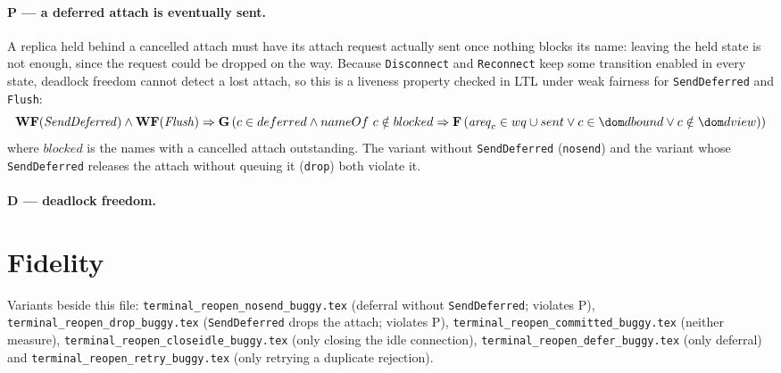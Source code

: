 \documentclass[a4paper,10pt,fleqn]{article}
\begin{document}
\paragraph{P --- a deferred attach is eventually sent.}  A replica held
behind a cancelled attach must have its attach request actually sent once
nothing blocks its name: leaving the held state is not enough, since the
request could be dropped on the way.  Because \texttt{Disconnect} and
\texttt{Reconnect} keep some transition enabled in every state, deadlock
freedom cannot detect a lost attach, so this is a liveness property checked
in LTL under weak fairness for \texttt{SendDeferred} and \texttt{Flush}:
\[
  \mathbf{WF}(\mathit{SendDeferred}) \land \mathbf{WF}(\mathit{Flush})
  \Rightarrow
  \mathbf{G}\,(c \in deferred \land nameOf~c \notin blocked
    \Rightarrow \mathbf{F}\,(\mathit{areq}_c \in wq \cup sent
      \lor c \in \dom dbound \lor c \notin \dom dview))
\]
where $blocked$ is the names with a cancelled attach outstanding.  The
variant without \texttt{SendDeferred} (\texttt{nosend}) and the variant whose
\texttt{SendDeferred} releases the attach without queuing it
(\texttt{drop}) both violate it.

\paragraph{D --- deadlock freedom.}

\section{Fidelity}

Variants beside this file: \texttt{terminal\_reopen\_nosend\_buggy.tex} (deferral without \texttt{SendDeferred}; violates P), \texttt{terminal\_reopen\_drop\_buggy.tex} (\texttt{SendDeferred} drops the attach; violates P), \texttt{terminal\_reopen\_committed\_buggy.tex} (neither measure), \texttt{terminal\_reopen\_closeidle\_buggy.tex} (only closing the idle connection), \texttt{terminal\_reopen\_defer\_buggy.tex} (only deferral) and \texttt{terminal\_reopen\_retry\_buggy.tex} (only retrying a duplicate rejection).
\end{document}
